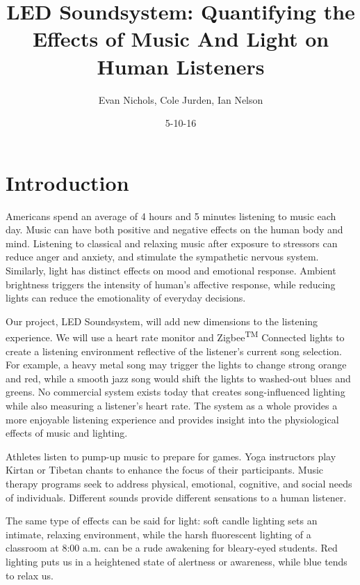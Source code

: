 \documentclass[11pt]{article}
\begin{document}
\begin{titlepage}
    \centering
    \title{LED Soundsystem: Quantifying the Effects of Music And Light on Human Listeners \\}
\date{5-10-16}
\author{Evan Nichols, Cole Jurden, Ian Nelson}
\end{titlepage}

\maketitle
\newpage
{}
\tableofcontents
\newpage

\section{Introduction}
Americans spend an average of 4 hours and 5 minutes listening to music each day.\cite{earshare} Music can have both positive and negative effects on the human body and mind. Listening to classical and relaxing music after exposure to stressors can reduce anger and anxiety, and stimulate the sympathetic nervous system.\cite{musicstress} Similarly, light has distinct effects on mood and emotional response. Ambient brightness triggers the intensity of human's affective response, while reducing lights can reduce the emotionality of everyday decisions.\cite{light} 

Our project, LED Soundsystem, will add new dimensions to the listening experience. We will use a heart rate monitor and Zigbee\textsuperscript{TM} Connected lights to create a listening environment reflective of the listener's current song selection. For example, a heavy metal song may trigger the lights to change strong orange and red, while a smooth jazz song would shift the lights to washed-out blues and greens. No commercial system exists today that creates song-influenced lighting while also measuring a listener's heart rate. The system as a whole provides a more enjoyable listening experience and provides insight into the physiological effects of music and lighting.

 Athletes listen to pump-up music to prepare for games. Yoga instructors play Kirtan or Tibetan chants to enhance the focus of their participants. Music therapy programs seek to address physical, emotional, cognitive, and social needs of individuals. Different sounds provide different sensations to a human listener. 

The same type of effects can be said for light: soft candle lighting sets an intimate, relaxing environment, while the harsh fluorescent lighting of a classroom at 8:00 a.m. can be a rude awakening for bleary-eyed students. Red lighting puts us in a heightened state of alertness or awareness, while blue tends to relax us. 
\end{document}
